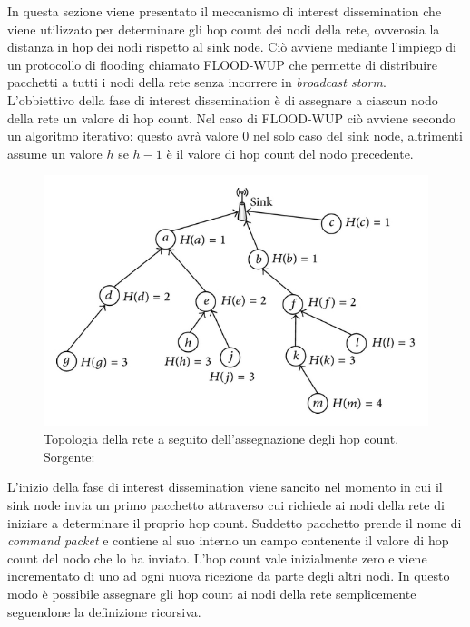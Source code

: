 \documentclass[binding=0.6cm,TFA]{sapthesis}
\begin{document}
In questa sezione viene presentato il meccanismo di interest dissemination che viene utilizzato per determinare gli hop count dei nodi della rete,
ovverosia la distanza in hop dei nodi rispetto al sink node. Ciò avviene mediante l'impiego di un protocollo di flooding chiamato FLOOD-WUP
\cite{novel-wake-up-receiver-paper} che permette di distribuire pacchetti a tutti i nodi della rete senza incorrere in \emph{broadcast storm}.\\

L'obbiettivo della fase di interest dissemination è di assegnare a ciascun nodo della rete un valore di hop count. Nel caso di FLOOD-WUP ciò
avviene secondo un algoritmo iterativo: questo avrà valore 0 nel solo caso del sink node, altrimenti assume un valore $h$ se $h-1$ è il valore
di hop count del nodo precedente.

\begin{figure}[h]
    \begin{center}
        \includegraphics[scale=1.8]{hop-count-algorithm.png}
        \caption{Topologia della rete a seguito dell'assegnazione degli hop count. Sorgente: \cite{hop-count-figure}}
    \end{center}
\end{figure}

L'inizio della fase di interest dissemination viene sancito nel momento in cui il sink node invia un primo pacchetto attraverso cui richiede
ai nodi della rete di iniziare a determinare il proprio hop count. Suddetto pacchetto prende il nome di \emph{command packet} e contiene
al suo interno un campo contenente il valore di hop count del nodo che lo ha inviato. L'hop count vale inizialmente zero 
e viene incrementato di uno ad ogni nuova ricezione da parte degli altri nodi. In questo modo è possibile assegnare gli hop count ai nodi
della rete semplicemente seguendone la definizione ricorsiva.\\
\end{document}

